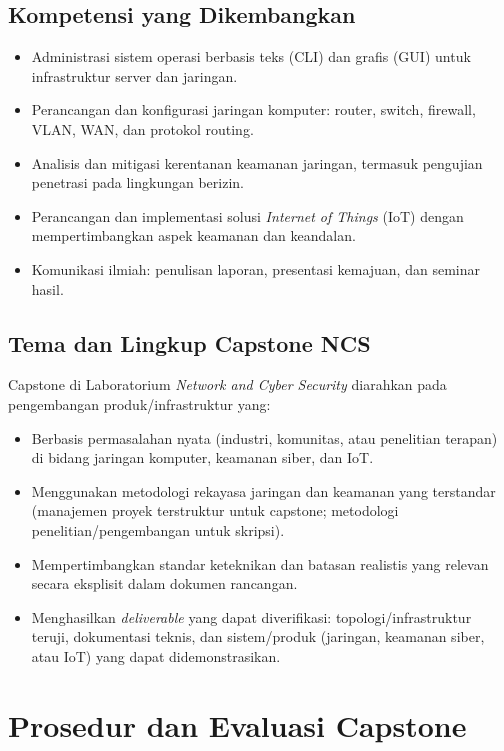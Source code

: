 \documentclass[12pt,a4paper]{report}
\begin{document}
\section{Kompetensi yang Dikembangkan}
\begin{itemize}
\item Administrasi sistem operasi berbasis teks (CLI) dan grafis (GUI) untuk infrastruktur server dan jaringan.
\item Perancangan dan konfigurasi jaringan komputer: router, switch, firewall, VLAN, WAN, dan protokol routing.
\item Analisis dan mitigasi kerentanan keamanan jaringan, termasuk pengujian penetrasi pada lingkungan berizin.
\item Perancangan dan implementasi solusi \emph{Internet of Things} (IoT) dengan mempertimbangkan aspek keamanan dan keandalan.
\item Komunikasi ilmiah: penulisan laporan, presentasi kemajuan, dan seminar hasil.
\end{itemize}

\section{Tema dan Lingkup Capstone NCS}
Capstone di Laboratorium \emph{Network and Cyber Security} diarahkan pada pengembangan produk/infrastruktur yang:
\begin{itemize}
\item Berbasis permasalahan nyata (industri, komunitas, atau penelitian terapan) di bidang jaringan komputer, keamanan siber, dan IoT.
\item Menggunakan metodologi rekayasa jaringan dan keamanan yang terstandar (manajemen proyek terstruktur untuk capstone; metodologi penelitian/pengembangan untuk skripsi).
\item Mempertimbangkan standar keteknikan dan batasan realistis yang relevan secara eksplisit dalam dokumen rancangan.
\item Menghasilkan \emph{deliverable} yang dapat diverifikasi: topologi/infrastruktur teruji, dokumentasi teknis, dan sistem/produk (jaringan, keamanan siber, atau IoT) yang dapat didemonstrasikan.
\end{itemize}

\chapter{Prosedur dan Evaluasi Capstone}
\end{document}
